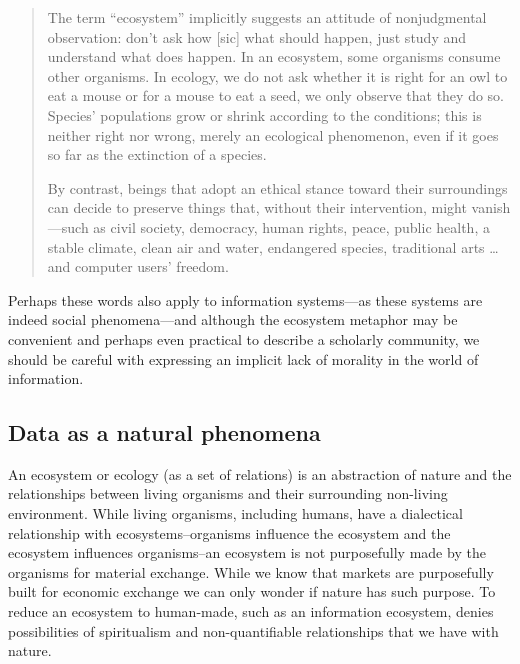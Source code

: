 \begin{quote}
The term “ecosystem” implicitly suggests an attitude of nonjudgmental observation: don't ask how [sic] what should happen, just study and understand what does happen. In an ecosystem, some organisms consume other organisms. In ecology, we do not ask whether it is right for an owl to eat a mouse or for a mouse to eat a seed, we only observe that they do so. Species' populations grow or shrink according to the conditions; this is neither right nor wrong, merely an ecological phenomenon, even if it goes so far as the extinction of a species.

By contrast, beings that adopt an ethical stance toward their surroundings can decide to preserve things that, without their intervention, might vanish—such as civil society, democracy, human rights, peace, public health, a stable climate, clean air and water, endangered species, traditional arts … and computer users' freedom. \citep{fsf_2014}
\end{quote}

Perhaps these words also apply to information systems—as these systems are indeed social phenomena—and although the ecosystem metaphor may be convenient and perhaps even practical to describe a scholarly community, we should be careful with expressing an implicit lack of morality in the world of information. 

\subsection{Data as a natural phenomena}

An ecosystem or ecology (as a set of relations) is an abstraction of nature and the relationships between living organisms and their surrounding non-living environment. While living organisms, including humans, have a dialectical relationship with ecosystems--organisms influence the ecosystem and the ecosystem influences organisms--an ecosystem is not purposefully made by the organisms for material exchange. While we know that markets are purposefully built for economic exchange we can only wonder if nature has such purpose. To reduce an ecosystem to human-made, such as an information ecosystem, denies possibilities of spiritualism and non-quantifiable relationships that we have with nature.

